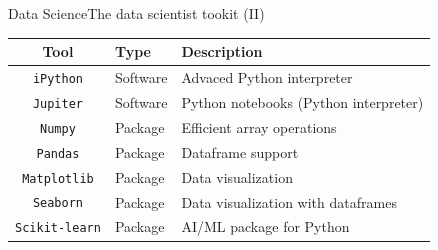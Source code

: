 \documentclass[10pt,compress]{beamer} %
\begin{document}
\begin{frame}{Data Science}{The data scientist tookit (II)}
   \begin{tabular}{cll}\hline
       \textbf{Tool}& \textbf{Type} & \textbf{Description}\\ \hline
	   \texttt{iPython} & Software & Advaced Python interpreter \\
	   \texttt{Jupiter} & Software & Python notebooks (Python interpreter) \\
	   \texttt{Numpy}   & Package  & Efficient array operations \\
	   \texttt{Pandas}  & Package  & Dataframe support \\
	   \texttt{Matplotlib} & Package & Data visualization \\
	   \texttt{Seaborn} & Package & Data visualization with dataframes \\
	   \texttt{Scikit-learn} & Package & AI/ML package for Python \\
	   \hline
   \end{tabular}
\end{frame}
\end{document}

